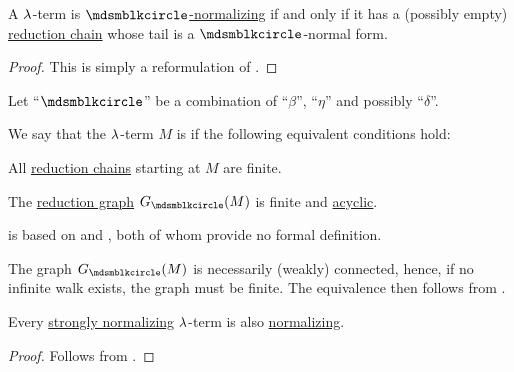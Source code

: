 \begin{proposition}\label{thm:term_normalizing_iff_exists_finite_reduction_chain}
  A \( \mathrm{\lambda} \)-term is \hyperref[def:lambda_term_normal_form]{\( \Anon \)-normalizing} if and only if it has a (possibly empty) \hyperref[def:lambda_term_reduction_graph]{reduction chain} whose tail is a \( \Anon \)-normal form.
\end{proposition}
\begin{proof}
  This is simply a reformulation of .
\end{proof}

\begin{definition}\label{def:strongly_normalizing_lambda_term}\mimprovised
  Let \enquote{\( {\Anon} \)} be a combination of \enquote{\( \beta \)}, \enquote{\( \eta \)} and possibly \enquote{\( \delta \)}.

  We say that the \( \mathrm{\lambda} \)-term \( M \) is  if the following equivalent conditions hold:
  \begin{thmenum}
     All \hyperref[def:lambda_term_reduction_graph]{reduction chains} starting at \( M \) are finite.

     The \hyperref[def:lambda_term_reduction_graph]{reduction graph} \( G_{\Anon}(M) \) is finite and \hyperref[def:acyclic_graph]{acyclic}.
  \end{thmenum}
\end{definition}
\begin{comments}
  \item {} is based on  and , both of whom provide no formal definition.
\end{comments}
\begin{defproof}
  The graph \( G_{\Anon}(M) \) is necessarily (weakly) connected, hence, if no infinite walk exists, the graph must be finite. The equivalence then follows from .
\end{defproof}

\begin{proposition}\label{thm:strongly_normalizing_term_is_normalizing}
  Every \hyperref[def:strongly_normalizing_lambda_term]{strongly normalizing} \( \mathrm{\lambda} \)-term is also \hyperref[def:lambda_term_normal_form]{normalizing}.
\end{proposition}
\begin{proof}
  Follows from .
\end{proof}

